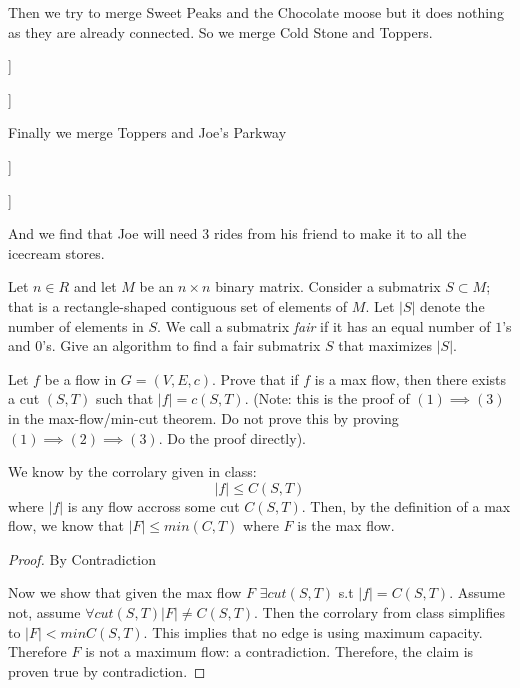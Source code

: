 \documentclass{article}
\begin{document}
Then we try to merge Sweet Peaks and the Chocolate moose but it does nothing as they are already connected. So we merge Cold Stone and Toppers.

\begin{forest}
[The Chocolate Moose
	[Genuine Ice Cream]
	[Sweet Peaks]]
\end{forest}
\begin{forest}
\end{forest}
\begin{forest}
[Cold Stone
	[Toppers]]
\end{forest}
\begin{forest}
\end{forest}

Finally we merge Toppers and Joe's Parkway

\begin{forest}
[The Chocolate Moose
	[Genuine Ice Cream]
	[Sweet Peaks]]
\end{forest}
\begin{forest}
\end{forest}
\begin{forest}
[Cold Stone
	[Toppers]
	[Joe's Parkway]]
\end{forest}

And we find that Joe will need 3 rides from his friend to make it to all the icecream stores.

\nextprob
Let $n \in R$ and let $M$ be an $n \times n$ binary matrix.  Consider a
submatrix $S \subset M$; that is a rectangle-shaped contiguous set of
elements of $M$.  Let $|S|$ denote the number of elements in $S$.  We call a
submatrix \emph{fair} if it has an equal number of $1$'s and $0$'s.  Give an
algorithm to find a fair submatrix $S$ that maximizes $|S|$.

\nextprob
Let $f$ be a flow in $G=(V,E,c)$.  Prove that if $f$ is a max flow, then there
exists a cut $(S,T)$ such that $|f| = c(S,T)$.  (Note: this is the proof of $(1)
\implies (3)$ in the max-flow/min-cut theorem.  Do not prove this by proving
$(1) \implies (2) \implies (3)$.  Do the proof directly).

We know by the corrolary given in class:
$$\left | f \right | \leq C(S,T)$$
where $\left | f \right |$ is any flow accross some cut $C(S,T)$. 
Then, by the definition of a max flow, we know that $\left | F \right | \leq min(C,T)$ where $F$ is the max flow.

\begin{proof} By Contradiction

Now we show that given the max flow $F$ $\exists cut(S,T)$ s.t $\left | f \right | = C(S,T)$. Assume not, assume $\forall cut(S,T) \left | F \right | \neq C(S,T)$. Then the corrolary from class simplifies to $\left | F \right | < min C(S,T)$. This implies that no edge is using maximum capacity. Therefore $F$ is not a maximum flow: a contradiction. Therefore, the claim is proven true by contradiction.
\end{proof}
\end{document}
